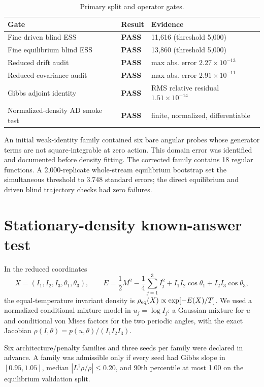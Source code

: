 \documentclass[10pt]{article}
\newcommand{\pass}{\textcolor{teal!75!black}{\textbf{PASS}}}
\begin{document}
\begin{table}[h]
\centering
\caption{Primary split and operator gates.}
\begin{tabular}{@{}lll@{}}
\toprule
Gate & Result & Evidence \\
\midrule
Fine driven blind ESS & \pass & 11,616 (threshold 5,000) \\
Fine equilibrium blind ESS & \pass & 13,860 (threshold 5,000) \\
Reduced drift audit & \pass & max abs. error $2.27\times10^{-13}$ \\
Reduced covariance audit & \pass & max abs. error $2.91\times10^{-11}$ \\
Gibbs adjoint identity & \pass & RMS relative residual $1.51\times10^{-14}$ \\
Normalized-density AD smoke test & \pass & finite, normalized, differentiable \\
\bottomrule
\end{tabular}
\end{table}

An initial weak-identity family contained six bare angular probes whose
generator terms are not square-integrable at zero action.  This domain error
was identified and documented before density fitting.  The corrected family
contains 18 regular functions.  A 2,000-replicate whole-stream equilibrium
bootstrap set the simultaneous threshold to 3.748 standard errors; the direct
equilibrium and driven blind trajectory checks had zero failures.

\section{Stationary-density known-answer test}

In the reduced coordinates
\[
X=(I_1,I_2,I_3,\theta_1,\theta_3),\qquad
E=\frac12M^2-\frac14\sum_{j=1}^3 I_j^2
 +I_1I_2\cos\theta_1+I_2I_3\cos\theta_3,
\]
the equal-temperature invariant density is
$\rho_{\rm eq}(X)\propto\exp[-E(X)/T]$.  We used a normalized conditional
mixture model in $u_j=\log I_j$: a Gaussian mixture for $u$ and conditional
von Mises factors for the two periodic angles, with the exact Jacobian
$\rho(I,\theta)=p(u,\theta)/(I_1I_2I_3)$.

Six architecture/penalty families and three seeds per family were declared in
advance.  A family was admissible only if every seed had Gibbs slope in
$[0.95,1.05]$, median $|L^\dagger\rho/\rho|\le0.20$, and 90th percentile at
most 1.00 on the equilibrium validation split.
\end{document}
